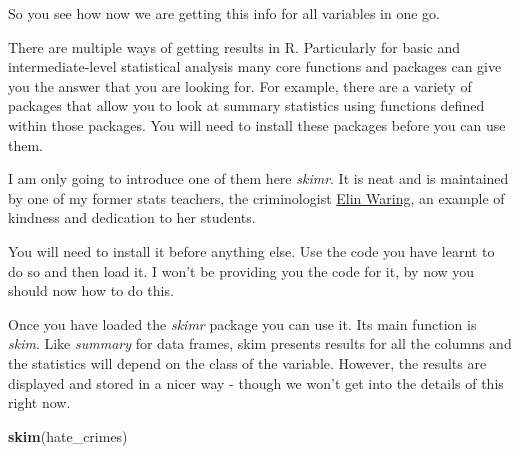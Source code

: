 \documentclass[
]{book}
\newenvironment{Shaded}{\begin{snugshade}}{\end{snugshade}}
\newcommand{\FunctionTok}[1]{\textcolor[rgb]{0.13,0.29,0.53}{\textbf{#1}}}
\newcommand{\NormalTok}[1]{#1}
\begin{document}
So you see how now we are getting this info for all variables in one go.

There are multiple ways of getting results in R. Particularly for basic and intermediate-level statistical analysis many core functions and packages can give you the answer that you are looking for. For example, there are a variety of packages that allow you to look at summary statistics using functions defined within those packages. You will need to install these packages before you can use them.

I am only going to introduce one of them here \emph{skimr}. It is neat and is maintained by one of my former stats teachers, the criminologist \href{https://www.lehman.edu/academics/sociology/faculty-waring.php}{Elin Waring}, an example of kindness and dedication to her students.

You will need to install it before anything else. Use the code you have learnt to do so and then load it. I won't be providing you the code for it, by now you should now how to do this.

Once you have loaded the \emph{skimr} package you can use it. Its main function is \emph{skim}. Like \emph{summary} for data frames, skim presents results for all the columns and the statistics will depend on the class of the variable. However, the results are displayed and stored in a nicer way - though we won't get into the details of this right now.

\begin{Shaded}
\begin{Highlighting}[]
\FunctionTok{skim}\NormalTok{(hate\_crimes)}
\end{Highlighting}
\end{Shaded}
\end{document}
